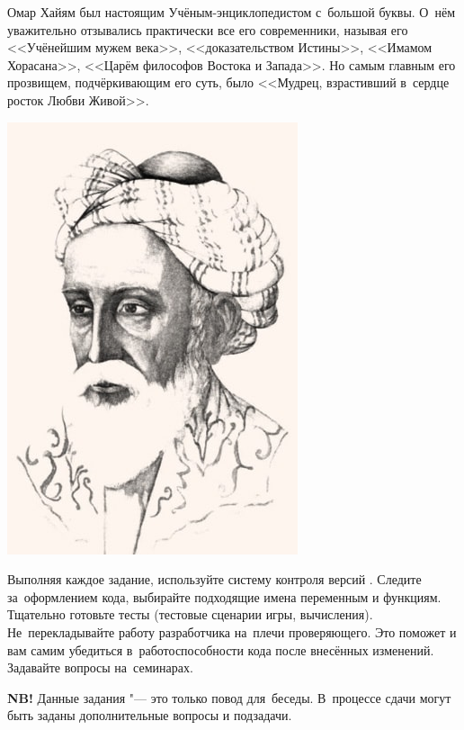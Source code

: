 \documentclass[a4paper,11pt,landscape,notitlepage,oneside,openany,final]{memoir}
\begin{document}
\begin{center}
    \begin{minipage}[b]{18em}
     	\large Омар Хайям был настоящим Учёным-энциклопедистом с~большой буквы. О~нём уважительно отзывались практически все его современники, называя его <<Учёнейшим мужем века>>, <<доказательством Истины>>, <<Имамом Хорасана>>, <<Царём философов Востока и Запада>>. Но самым главным его прозвищем, подчёркивающим его суть, было <<Мудрец, взрастивший в~сердце росток Любви Живой>>.

        \vspace{5ex}
    \end{minipage}\hspace{3em}
    \includegraphics[height=0.5\textheight]{images/omar_khayyam.png}
\end{center}


\clearpage
\renewcommand{\rightmark}{Задания}
Выполняя каждое задание, используйте систему контроля версий \git{}. Следите за~оформлением кода, выбирайте подходящие имена переменным и функциям. Тщательно готовьте тесты (тестовые сценарии игры, вычисления). Не~перекладывайте работу разработчика на~плечи проверяющего. Это поможет и вам самим убедиться в~работоспособности кода после внесённых изменений. Задавайте вопросы на~семинарах.

\textbf{NB!} Данные задания "--- это только повод для~беседы. В~процессе сдачи могут быть заданы дополнительные вопросы и подзадачи.
\end{document}
